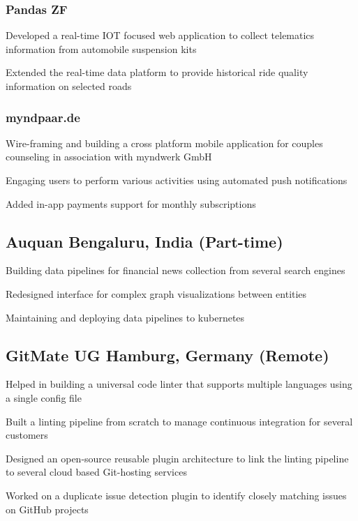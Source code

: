 \documentclass[letter,10pt]{article}
\begin{document}
\subsubsection*{Pandas ZF}
\begin{zitemize}
\item Developed a real-time IOT focused web application to collect telematics information from automobile suspension kits
\item Extended the real-time data platform to provide historical ride quality information on selected roads
\end{zitemize}

\subsubsection*{myndpaar.de}
\begin{zitemize}
\item Wire-framing and building a cross platform mobile application for couples counseling in association with myndwerk GmbH
\item Engaging users to perform various activities using automated push notifications
\item Added in-app payments support for monthly subscriptions
\end{zitemize}


\subsection{Auquan \hfill Bengaluru, India (Part-time)}
\begin{zitemize}
\item Building data pipelines for financial news collection from several search engines
\item Redesigned interface for complex graph visualizations between entities
\item Maintaining and deploying data pipelines to kubernetes
\end{zitemize}


\subsection{GitMate UG \hfill Hamburg, Germany (Remote)}
\begin{zitemize}
\item Helped in building a universal code linter that supports multiple languages using a single config file
\item Built a linting pipeline from scratch to manage continuous integration for several customers
\item Designed an open-source reusable plugin architecture to link the linting pipeline to several cloud based Git-hosting services
\item Worked on a duplicate issue detection plugin to identify closely matching issues on GitHub projects
\end{zitemize}
\end{document}
